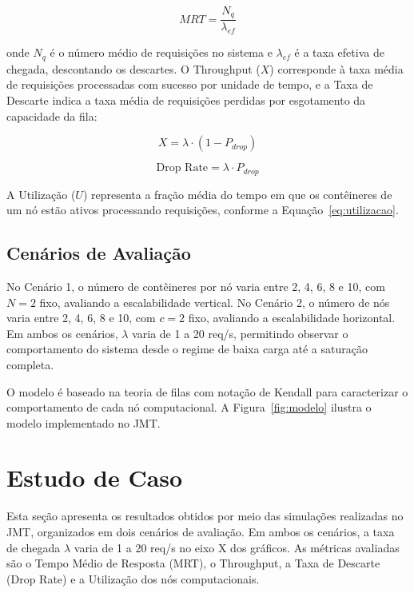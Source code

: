 \documentclass[conference]{IEEEtran}
\begin{document}
\begin{equation}
    MRT = \frac{N_{q}}{\lambda_{ef}}
    \label{eq:mrt}
\end{equation}

\noindent onde $N_q$ é o número médio de requisições no
sistema e $\lambda_{ef}$ é a taxa efetiva de chegada,
descontando os descartes. O Throughput ($X$) corresponde
à taxa média de requisições processadas com sucesso por
unidade de tempo, e a Taxa de Descarte indica a taxa média
de requisições perdidas por esgotamento da capacidade da
fila:

\begin{equation}
    X = \lambda \cdot (1 - P_{drop})
    \label{eq:throughput}
\end{equation}

\begin{equation}
    \text{Drop Rate} = \lambda \cdot P_{drop}
    \label{eq:droprate}
\end{equation}

A Utilização ($U$) representa a fração média do tempo em
que os contêineres de um nó estão ativos processando
requisições, conforme a Equação~\ref{eq:utilizacao}.

\subsection{Cenários de Avaliação}

No Cenário 1, o número de contêineres por nó varia entre 2,
4, 6, 8 e 10, com $N = 2$ fixo, avaliando a escalabilidade
vertical. No Cenário 2, o número de nós varia entre 2, 4, 6,
8 e 10, com $c = 2$ fixo, avaliando a escalabilidade
horizontal. Em ambos os cenários, $\lambda$ varia de 1 a
20 req/s, permitindo observar o comportamento do sistema
desde o regime de baixa carga até a saturação completa.
 
O modelo é baseado na teoria de filas com notação de Kendall
para caracterizar o comportamento de cada nó computacional.
A Figura~\ref{fig:modelo} ilustra o modelo implementado no JMT.

\section{Estudo de Caso}

Esta seção apresenta os resultados obtidos por meio das
simulações realizadas no JMT, organizados em dois cenários
de avaliação. Em ambos os cenários, a taxa de chegada $\lambda$
varia de 1 a 20 req/s no eixo X dos gráficos. As métricas
avaliadas são o Tempo Médio de Resposta (MRT), o Throughput,
a Taxa de Descarte (Drop Rate) e a Utilização dos nós
computacionais.
\end{document}
